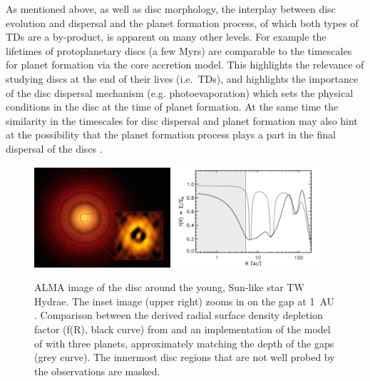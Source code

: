 \documentclass[10pt,fleqn,twoside]{article}
\begin{document}
As mentioned above, as well as disc morphology, the interplay between disc evolution and
dispersal and the planet formation process, of which both types of TDs
are a
by-product, is apparent on many other
 levels. For example the lifetimes of protoplanetary discs (a few
Myrs) are comparable to the timescales for planet formation via the core
accretion model. This highlights the relevance of studying discs at the end
of their lives (i.e.\ TDs), and highlights the importance
of the disc dispersal mechanism (e.g. photoevaporation) which sets the
physical conditions in the disc at the time of planet formation. 
At the same time the similarity in the timescales for disc dispersal
and planet formation may also hint at the possibility that the planet
formation process plays a part in the final dispersal of the discs
\citep[e.g.][]{2013MNRAS.430.1392R, 2015MNRAS.454.2173R}.


\begin{figure}
\centerline{\includegraphics[width=0.45\textwidth]{figures/twhya.jpg}
\includegraphics[width=0.5\textwidth]{figures/vanboekel.pdf}}
\caption{ ALMA image of the disc around the young,
  Sun-like star TW Hydrae. The inset image (upper right) zooms in on
  the gap at 1~AU .  Comparison between the derived radial surface density
depletion factor (f(R), black curve) from \citet{2016arXiv161008939V} and an implementation
of the model of \citet{2015ApJ...807L..11D} with three planets, approximately
matching the depth of the gaps (grey curve). The innermost disc
regions that are not well probed by the observations are masked. } 
\label{fig:twhya}
\end{figure}
\end{document}
